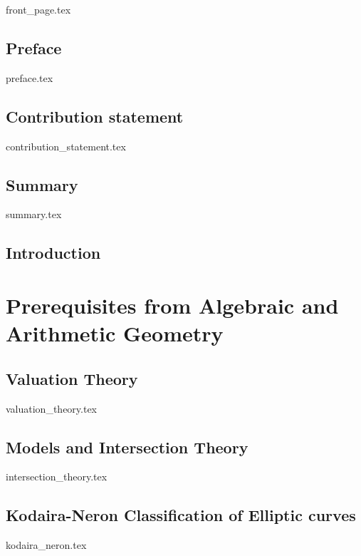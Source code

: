 


\rmfamily
\setcounter{page}{0}
\newpage
{front_page.tex}
\chapter*{Preface} \label{chap:preface}
{preface.tex}
\chapter*{Contribution statement} \label{chap:acknowledgements}
{contribution_statement.tex}
\chapter*{Summary} \label{chap:summary}
{summary.tex}

\myprintglossary
\myprintnomenclature
\listoftodos
\tableofcontents


\setcounter{page}{0}

\chapter{Introduction} \label{chap:introduction}


\part{Prerequisites from Algebraic and Arithmetic Geometry}\label{part:AG}
\chapter{Valuation Theory} \label{chap:valuation_theory}
{valuation_theory.tex}



\chapter{Models and Intersection Theory} \label{chap:models_and_intersection_theory}
{intersection_theory.tex}

\chapter{Kodaira-Neron Classification of Elliptic curves} \label{chap:kodaira_neron_classification_of_elliptic_curves}
{kodaira_neron.tex}

